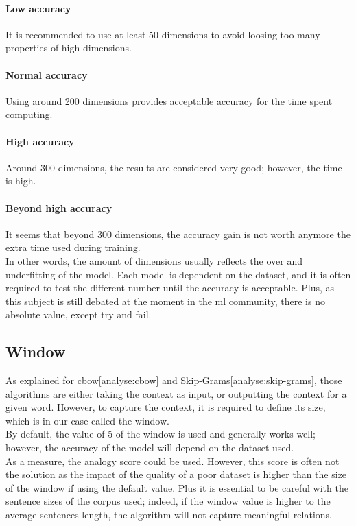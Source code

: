 \paragraph{Low accuracy}
It is recommended to use at least 50 dimensions to avoid loosing too many properties of high dimensions.

\paragraph{Normal accuracy}
Using around 200 dimensions provides acceptable accuracy for the time spent computing.

\paragraph{High accuracy}
Around 300 dimensions, the results are considered very good; however, the time is high.

\paragraph{Beyond high accuracy}
It seems that beyond 300 dimensions, the accuracy gain is not worth anymore the extra time used during training.\\

In other words, the amount of dimensions usually reflects the over and underfitting of the model. Each model is dependent on the dataset, and it is often required to test the different number until the accuracy is acceptable. Plus, as this subject is still debated at the moment in the \gls{ml} community, there is no absolute value, except try and fail.


\subsection{Window}
\label{analyse:window}
As explained for \gls{cbow}\ref{analyse:cbow} and Skip-Grams\ref{analyse:skip-grams}, those algorithms are either taking the context as input, or outputting the context for a given word. However, to capture the context, it is required to define its size, which is in our case called the window.\\

By default, the value of  5 of the window is used and generally works well; however, the accuracy of the model will depend on the dataset used.\\

As a measure, the analogy score could be used. However, this score is often not the solution as the impact of the quality of a poor dataset is higher than the size of the window if using the default value. Plus it is essential to be careful with the sentence sizes of the corpus used; indeed, if the window value is higher to the average sentences length, the algorithm will not capture meaningful relations. \\

